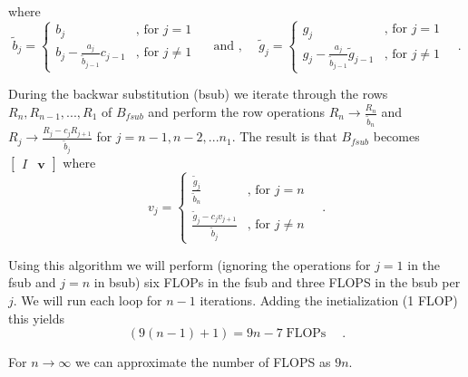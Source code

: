 \documentclass[final, 3p, times, 11.5pt]{article}
\begin{document}
where $$
\tilde{b}_j = 
\begin{cases} 
b_j \quad  & \text{, for } j=1 \\
b_j - \frac{a_j}{\tilde{b}_{j-1}}c_{j-1} & \text{, for } j\neq 1
\end{cases}
\quad \text{ and , } \quad
\tilde{g}_j = 
\begin{cases} 
g_j \quad  & \text{, for } j=1 \\
g_j - \frac{a_j}{\tilde{b}_{j-1}}\tilde{g}_{j-1} & \text{, for } j\neq 1
\end{cases} \quad .
$$

During the backwar substitution (bsub) we iterate through the rows $R_n, R_{n-1}, ..., R_1$ of $B_{fsub}$ and perform the row operations $R_n \to \frac{R_n}{\tilde{b}_n}$ and $R_j \to \frac{R_j -c_jR_{j+1}}{\tilde{b}_j}$ for $j=n-1, n-2, ... n_1$. The result is that $B_{fsub}$ becomes $\begin{bmatrix}I & \mathbf{v} \end{bmatrix}$ where
$$
v_j = 
\begin{cases} 
\frac{\tilde{g}_j}{\tilde{b}_n} \quad  & \text{, for } j=n \\
\frac{\tilde{g}_j - c_jv_{j+1}}{\tilde{b}_j} & \text{, for } j\neq n
\end{cases} \quad .
$$

Using this algorithm we will perform (ignoring the operations for $j=1$ in the fsub and $j=n$ in bsub) six FLOPs in the fsub and three FLOPS in the bsub per $j$. We will run each loop for $n-1$ iterations. Adding the inetialization (1 FLOP) this yields 
$$
(9(n-1)+1) = 9n-7 \operatorname{FLOPs} \quad.
$$

For $n\to \infty$ we can approximate the number of FLOPS as $9n$.
\end{document}
